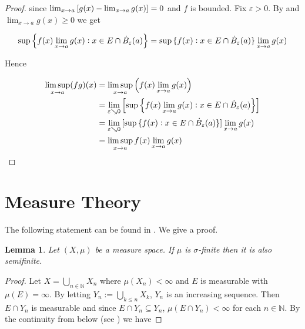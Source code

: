 \documentclass[11pt,oneside,a4paper,final]{amsart}
\theoremstyle{bold}
\newtheorem{lemma}{Lemma}[section]
\begin{document}
\begin{appendix}
\begin{proof}
        \noindent since $\lim_{x \to a}\sbr[0]{ g(x) - \lim_{x \to a} g(x)} = 0$ and $f$ is bounded. Fix $\varepsilon > 0$. By \cite[357]{bourbaki:general_topology:1995} and $\lim_{x \to a}g(x) \geq 0$ we get

        \begin{equation*}
            \sup\cbr[2]{ f(x)\lim_{x \to a}g(x) : x \in E \cap \dot{B}_\varepsilon(a)} = \sup\cbr[0]{ f(x) : x \in E \cap \dot{B}_\varepsilon(a)}\lim_{x \to a}g(x)
        \end{equation*}

        Hence

        \begin{equation*}
            \begin{aligned}
                \limsup_{x \to a} (fg)(x) & = \limsup_{x \to a}\del[2]{ f(x) \lim_{x \to a}g(x) }                                                                \\
                                          & = \lim_{\varepsilon \searrow 0} \sbr[2]{ \sup\cbr[2]{ f(x)\lim_{x \to a}g(x) : x \in E \cap \dot{B}_\varepsilon(a)}} \\
                                          & = \lim_{\varepsilon \searrow 0} \sbr[0]{ \sup\cbr[0]{ f(x) : x \in E \cap \dot{B}_\varepsilon(a)}}\lim_{x \to a}g(x) \\
                                          & = \limsup_{x \to a}f(x) \lim_{x \to a} g(x)
            \end{aligned}
        \end{equation*}
    \end{proof}

    \section{Measure Theory}
    The following statement can be found in \cite[27]{folland:real_analysis:1999}. We give a proof.

    \begin{lemma}
        Let $(X,\mu)$ be a measure space. If $\mu$ is $\sigma$-finite then it is also semifinite.
    \end{lemma}

    \begin{proof}
        Let $X = \bigcup_{n \in \mathbb{N}} X_n$ where $\mu(X_n) < \infty$ and $E$ is measurable with $\mu(E) = \infty$. By letting $Y_n := \bigcup_{k \leq n} X_k$, $Y_n$ is an increasing sequence. Then $E \cap Y_n$ is measurable and since $E \cap Y_n \subseteq Y_n$, $\mu(E \cap Y_n) < \infty$ for each $n \in \mathbb{N}$. By the continuity from below (see \cite[26]{folland:real_analysis:1999}) we have


\end{proof}
\end{appendix}
\end{document}
